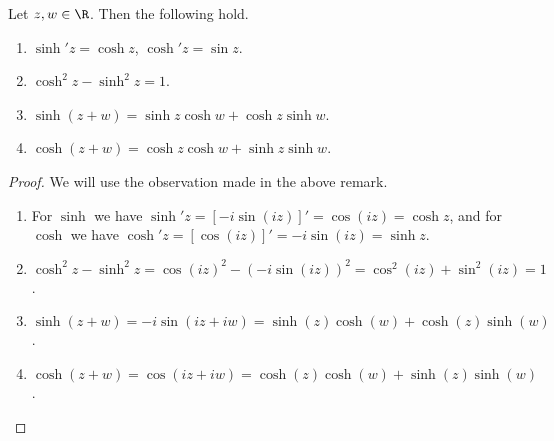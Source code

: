 \begin{proposition}
	Let $z, w \in \R$. Then the following hold.
	\begin{enumerate}[label=(\roman*)]
		\item $\sinh' z = \cosh z$, $\cosh' z = \sin z$.
		\item $\cosh^2 z - \sinh^2 z = 1$.
		\item $\sinh (z+w)=\sinh z \cosh w+\cosh z \sinh w$.
		\item $\cosh (z+w)=\cosh z \cosh w+\sinh z \sinh w$.
	\end{enumerate}
\end{proposition}
\begin{proof}
We will use the observation made in the above remark.
\begin{enumerate}[label=(\roman*)]
	\item For $\sinh$ we have $\sinh'z = [-i\sin(iz)]' = \cos(iz) = \cosh z$, and for $\cosh$ we have $\cosh'z = [\cos(iz)]' = -i\sin(iz) = \sinh z$.
	\item $\cosh^2 z - \sinh^2 z = \cos(iz)^2 - (-i\sin(iz))^2 = \cos^2(iz) + \sin^2(iz) = 1$.
	\item $\sinh(z + w) = -i\sin(iz + iw)= \sinh(z)\cosh(w) + \cosh(z)\sinh(w)$.
	\item $\cosh(z + w) = \cos(iz + iw)= \cosh(z)\cosh(w) + \sinh(z)\sinh(w)$.\qedhere
\end{enumerate}
\end{proof}

\clearpage
